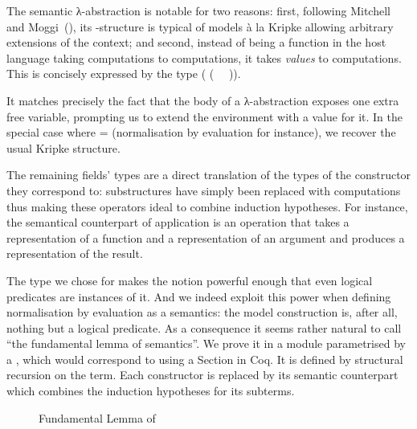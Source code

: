 
The semantic λ-abstraction is notable for two reasons: first, following
Mitchell and Moggi~(\citeyear{mitchell1991kripke}), its -structure is
typical of models à la Kripke allowing arbitrary extensions of the context;
and second, instead of being a function in the host language taking
computations to computations,  it takes \emph{values} to computations.
This is concisely expressed by the type ({ (~  ~)}).

It matches precisely the fact that the body of a λ-abstraction exposes
one extra free variable, prompting us to extend the environment with a
value for it. In the special case where  =  (normalisation
by evaluation for instance), we recover the usual Kripke structure.


The remaining fields' types are a direct translation of the types of the
constructor they correspond to: substructures have simply been replaced with
computations thus making these operators ideal to combine induction hypotheses.
For instance, the semantical counterpart of application is an operation that
takes a representation of a function and a representation of an argument and
produces a representation of the result.


The type we chose for  makes the  notion powerful enough that
even logical predicates are instances of it. And we indeed exploit this power when
defining normalisation by evaluation as a semantics: the model construction is, after
all, nothing but a logical predicate. As a consequence it seems rather natural to call
 ``the fundamental lemma of semantics''. We prove it in a module parametrised
by a , which would correspond to using a Section in Coq. It is defined by
structural recursion on the term. Each constructor is replaced by its semantic counterpart
which combines the induction hypotheses for its subterms.

\begin{figure}[h]
\caption{Fundamental Lemma of \label{fig:fundsem}}
\end{figure}


